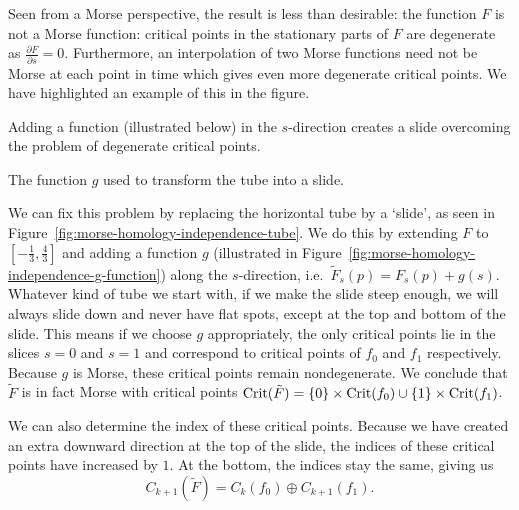 \begin{myproof}
Seen from a Morse perspective, the result is less than desirable: the function $F$ is not a Morse function: critical points in the stationary parts of $F$ are degenerate as $\frac{\partial F}{\partial s} = 0$.
Furthermore, an interpolation of two Morse functions need not be Morse at each point in time which gives even more degenerate critical points. We have highlighted an example of this in the figure.

\begin{marginfigure}
    \centering
    \caption{Adding a function (illustrated below) in the $s$-direction creates a slide overcoming the problem of degenerate critical points.}
    \label{fig:morse-homology-independence-tube}
\end{marginfigure}

\begin{marginfigure}
    \centering
    \caption{The function $g$ used to transform the tube into a slide.}
    \label{fig:morse-homology-independence-g-function}
\end{marginfigure}

We can fix this problem by replacing the horizontal tube by a `slide', as seen in Figure~\ref{fig:morse-homology-independence-tube}.
We do this by extending $F$ to $\left[-\frac{1}{3}, \frac{4}{3}\right]$ and adding a function $g$ (illustrated in Figure~\ref{fig:morse-homology-independence-g-function}) along the $s$-direction, i.e.\ $\tilde{F}_s(p) = F_s(p) + g(s)$.
Whatever kind of tube we start with, if we make the slide steep enough, we will always slide down and never have flat spots, except at the top and bottom of the slide.
This means if we choose $g$ appropriately, the only critical points lie in the slices $s=0$ and  $s=1$ and correspond to critical points of $f_0$ and $f_1$ respectively.
Because $g$ is Morse, these critical points remain nondegenerate.
We conclude that $\tilde{F}$ is in fact Morse with critical points $\operatorname{Crit}(\tilde{F}) = \{0\} \times \operatorname{Crit}(f_0) \cup \{1\} \times \operatorname{Crit}(f_1)$.

We can also determine the index of these critical points.
Because we have created an extra downward direction at the top of the slide, the indices of these critical points have increased by $1$.
At the bottom, the indices stay the same, giving us
\[
    C_{k+1}(\tilde{F}) = C_k(f_0) \oplus C_{k+1}(f_1)
.\] 


\end{myproof}
